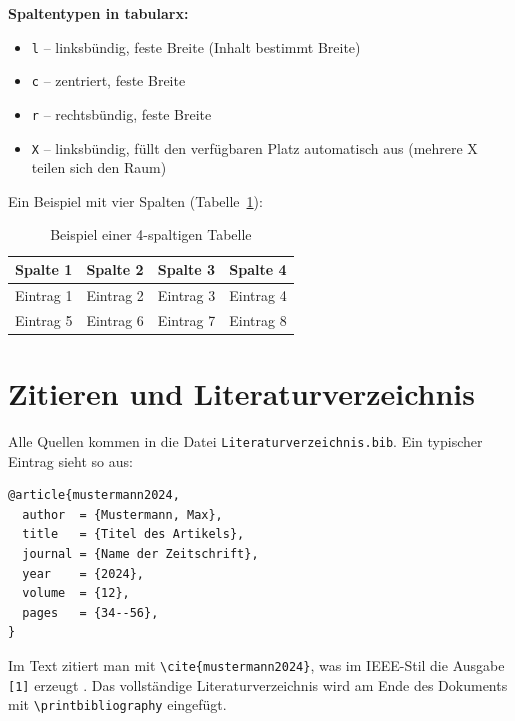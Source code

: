 \textbf{Spaltentypen in tabularx:}
\begin{itemize}
    \item \texttt{l} – linksbündig, feste Breite (Inhalt bestimmt Breite)
    \item \texttt{c} – zentriert, feste Breite
    \item \texttt{r} – rechtsbündig, feste Breite
    \item \texttt{X} – linksbündig, füllt den verfügbaren Platz automatisch aus (mehrere X teilen sich den Raum)
\end{itemize}

Ein Beispiel mit vier Spalten (Tabelle~\ref{tab:beispiel_vierspaltig}):

\begin{table}[h!]
\centering
\caption{Beispiel einer 4-spaltigen Tabelle}
\label{tab:beispiel_vierspaltig}
\begin{tabularx}{\textwidth}{l X X X}
\toprule
\textbf{Spalte 1} & \textbf{Spalte 2} & \textbf{Spalte 3} & \textbf{Spalte 4} \\
\midrule
Eintrag 1 & Eintrag 2 & Eintrag 3 & Eintrag 4 \\
\addlinespace
Eintrag 5 & Eintrag 6 & Eintrag 7 & Eintrag 8 \\
\bottomrule
\end{tabularx}
\end{table}

\section{Zitieren und Literaturverzeichnis}
\label{sec:literatur}

Alle Quellen kommen in die Datei \texttt{Literaturverzeichnis.bib}.
Ein typischer Eintrag sieht so aus:

\begin{lstlisting}[language=tex]
@article{mustermann2024,
  author  = {Mustermann, Max},
  title   = {Titel des Artikels},
  journal = {Name der Zeitschrift},
  year    = {2024},
  volume  = {12},
  pages   = {34--56},
}
\end{lstlisting}

Im Text zitiert man mit \texttt{\textbackslash cite\{mustermann2024\}}, was im IEEE-Stil die Ausgabe \texttt{[1]} erzeugt \cite{Muster2025}.
Das vollständige Literaturverzeichnis wird am Ende des Dokuments mit \texttt{\textbackslash printbibliography} eingefügt.

